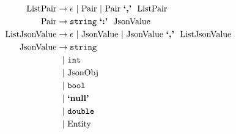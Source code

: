 \documentclass[11pt]{article}
\begin{document}
\begin{align*}
\mathrm{ListPair} & \rightarrow \epsilon\ |\  \mathrm{Pair}\ |\  \mathrm{Pair}\ \textbf{`,'}\ \ \mathrm{ListPair}\\
\mathrm{Pair} & \rightarrow \texttt{string}\  \textbf{`:'}\ \ \mathrm{JsonValue}\\
\mathrm{ListJsonValue} & \rightarrow \epsilon\ |\  \mathrm{JsonValue}\ |\  \mathrm{JsonValue}\ \textbf{`,'}\ \ \mathrm{ListJsonValue}\\
\mathrm{JsonValue} & \rightarrow \texttt{string}\ \\
			&\ \ |\  \texttt{int}\\
			&\ \ |\  \mathrm{JsonObj}\\
			&\ \ |\  \texttt{bool}\\
			&\ \ |\  \textbf{`null'}\ \\
			&\ \ |\  \texttt{double}\\
			&\ \ |\  \mathrm{Entity}
\end{align*}
\end{document}
